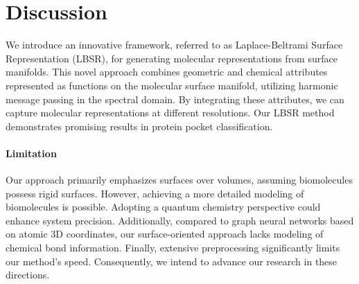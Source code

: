 \section{Discussion}

We introduce an innovative framework, referred to as Laplace-Beltrami Surface Representation (LBSR), for generating molecular representations from surface manifolds. This novel approach combines geometric and chemical attributes represented as functions on the molecular surface manifold, utilizing harmonic message passing in the spectral domain. By integrating these attributes, we can capture molecular representations at different resolutions. Our LBSR method demonstrates promising results in protein pocket classification.

\paragraph{Limitation}

Our approach primarily emphasizes surfaces over volumes, assuming biomolecules possess rigid surfaces. However, achieving a more detailed modeling of biomolecules is possible. Adopting a quantum chemistry perspective could enhance system precision. Additionally, compared to graph neural networks based on atomic 3D coordinates, our surface-oriented approach lacks modeling of chemical bond information. Finally, extensive preprocessing significantly limits our method's speed. Consequently, we intend to advance our research in these directions.